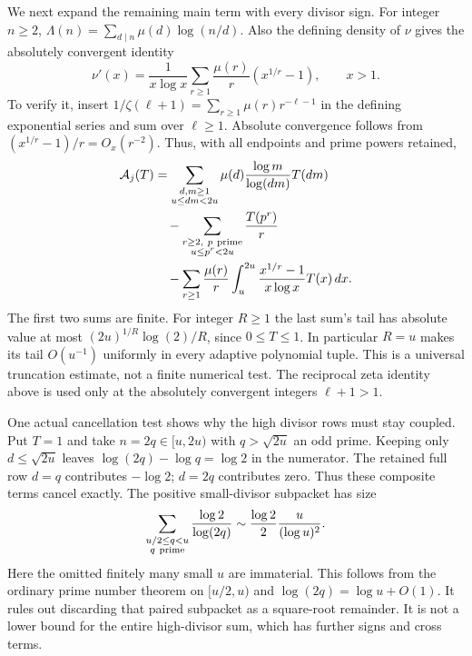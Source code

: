 \documentclass[11pt]{article}
\theoremstyle{definition}
\begin{document}
We next expand the remaining main term with every divisor sign.
For integer $n\ge2$,
$\Lambda(n)=\sum_{d\mid n}\mu(d)\log(n/d)$.
Also the defining density of $\nu$ gives the absolutely convergent
identity
\[
 \nu'(x)=\frac1{x\log x}
       \sum_{r\ge1}\frac{\mu(r)}r(x^{1/r}-1),\qquad x>1.
\]
To verify it, insert
$1/\zeta(\ell+1)=\sum_{r\ge1}\mu(r)r^{-\ell-1}$
in the defining exponential series and sum over $\ell\ge1$.
Absolute convergence follows from
$(x^{1/r}-1)/r=O_x(r^{-2})$.
Thus, with all endpoints and prime powers retained,
\begin{equation}
 \begin{aligned}
 \mathcal A_j(T)
 &=\sum_{\substack{d,m\ge1\\u\le dm<2u}}
       \mu(d)\frac{\log m}{\log(dm)}T(dm)\\
 &\quad-\sum_{\substack{r\ge2,\ p\ {\rm prime}\\u\le p^r<2u}}
                         \frac{T(p^r)}r\\
 &\quad-\sum_{r\ge1}\frac{\mu(r)}r
       \int_u^{2u}\frac{x^{1/r}-1}{x\log x}T(x)\,dx .
 \end{aligned}
 \label{eq:independent-count-full-Mobius-row}
\end{equation}
The first two sums are finite.
For integer $R\ge1$ the last sum's tail has absolute value
at most $(2u)^{1/R}\log(2)/R$, since $0\le T\le1$.
In particular $R=u$ makes its tail $O(u^{-1})$ uniformly
in every adaptive polynomial tuple. This is a universal
truncation estimate, not a finite numerical test.
The reciprocal zeta identity above is used only at the
absolutely convergent integers $\ell+1>1$.

One actual cancellation test shows why the high divisor rows
must stay coupled. Put $T=1$ and take $n=2q\in[u,2u)$
with $q>\sqrt{2u}$ an odd prime.
Keeping only $d\le\sqrt{2u}$ leaves
$\log(2q)-\log q=\log2$ in the numerator.
The retained full row $d=q$ contributes $-\log2$;
$d=2q$ contributes zero. Thus these composite terms cancel
exactly. The positive small-divisor subpacket has size
\begin{equation}
 \sum_{\substack{u/2\le q<u\\q\ {\rm prime}}}
       \frac{\log2}{\log(2q)}
              \sim\frac{\log2}{2}\frac{u}{(\log u)^2}.
 \label{eq:independent-count-semiprime-cross-cancellation}
\end{equation}
Here the omitted finitely many small $u$ are immaterial.
This follows from the ordinary prime number theorem on
$[u/2,u)$ and $\log(2q)=\log u+O(1)$.
It rules out discarding that paired subpacket as a square-root
remainder. It is not a lower bound for the entire high-divisor
sum, which has further signs and cross terms.
\end{document}
